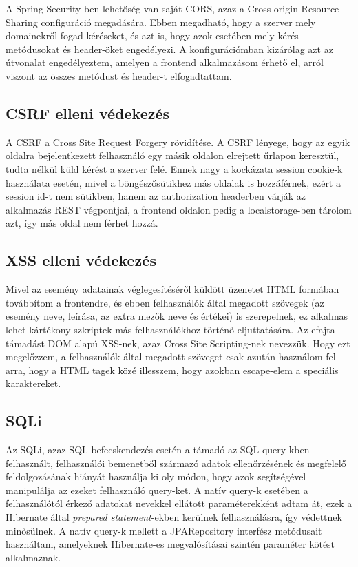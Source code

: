 \documentclass[a4paper,12pt]{report}
\theoremstyle{definition}
\theoremstyle{remark}
\begin{document}
A Spring Security-ben lehetőség van saját CORS, azaz a Cross-origin Resource Sharing\cite{Corswebsite} configuráció megadására. Ebben megadható, hogy a szerver mely domainekről fogad kéréseket, és azt is, hogy azok esetében mely kérés metódusokat és header-öket engedélyezi. A konfigurációmban kizárólag azt az útvonalat engedélyeztem, amelyen a frontend alkalmazásom érhető el, arról viszont az összes metódust és header-t elfogadtattam.


	\subsection{CSRF elleni védekezés}

A CSRF a Cross Site Request Forgery rövidítése. A CSRF lényege, hogy az egyik oldalra bejelentkezett felhasználó egy másik oldalon elrejtett űrlapon keresztül, tudta nélkül küld kérést a szerver felé\cite{Infbiztwebsite}. Ennek nagy a kockázata session cookie-k használata esetén, mivel a böngészősütikhez más oldalak is hozzáférnek, ezért a session id-t nem sütikben, hanem az authorization headerben várják az alkalmazás REST végpontjai, a frontend oldalon pedig a localstorage-ben tárolom azt, így más oldal nem férhet hozzá.


	\subsection{XSS elleni védekezés}

Mivel az esemény adatainak véglegesítéséről küldött üzenetet HTML formában továbbítom a frontendre, és ebben felhasználók által megadott szövegek (az esemény neve, leírása, az extra mezők neve és értékei) is szerepelnek, ez alkalmas lehet kártékony szkriptek más felhasználókhoz történő eljuttatására. Az efajta támadást DOM alapú XSS-nek, azaz Cross Site Scripting-nek nevezzük\cite{Infbiztwebsite}. Hogy ezt megelőzzem, a felhasználók által megadott szöveget csak azután használom fel arra, hogy a HTML tagek közé illesszem, hogy azokban escape-elem a speciális karaktereket.

	\subsection{SQLi}

Az SQLi\cite{Infbiztwebsite2}, azaz SQL befecskendezés esetén a támadó az SQL query-kben felhasznált, felhasználói bemenetből származó adatok ellenőrzésének és megfelelő feldolgozásának hiányát használja ki oly módon, hogy azok segítségével manipulálja az ezeket felhasználó query-ket. A natív query-k esetében a felhasználótól érkező adatokat nevekkel ellátott paraméterekként adtam át, ezek a Hibernate által  \textit{prepared statement}-ekben kerülnek felhasználásra, így védettnek minősülnek\cite{hibernatewebsite2}. A natív query-k mellett a JPARepository interfész metódusait használtam, amelyeknek Hibernate-es megvalósításai szintén paraméter kötést alkalmaznak.
\end{document}

